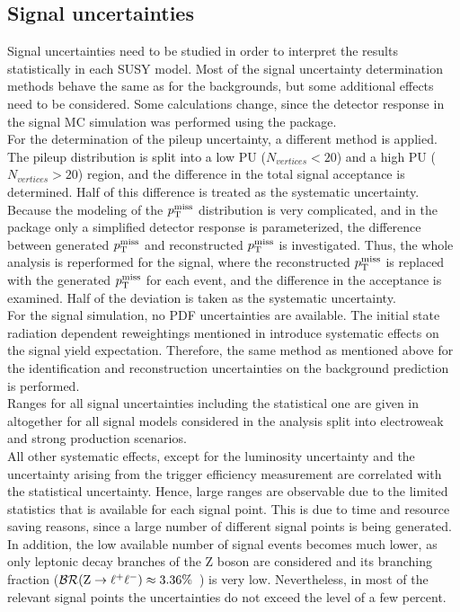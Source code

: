 \subsection{Signal uncertainties}
Signal uncertainties need to be studied in order to interpret the results statistically in each SUSY model.
Most of the signal uncertainty determination methods behave the same as for the backgrounds, but some additional effects need to be considered. Some calculations change, since the detector response in the signal MC simulation was performed using the \FASTSIM package.\\
For the determination of the pileup uncertainty, a different method is applied. The pileup distribution is split into a low PU ($N_{vertices}<20$) and a high PU ($N_{vertices}>20$) region, and the difference in the total signal acceptance is determined. Half of this difference is treated as the systematic uncertainty.\\
Because the modeling of the $p_{\mathrm{T}}^\text{miss}$ distribution is very complicated, and in the \FASTSIM package only a simplified detector response is parameterized, the difference between generated $p_{\mathrm{T}}^\text{miss}$ and reconstructed $p_{\mathrm{T}}^\text{miss}$ is investigated. Thus, the whole analysis is reperformed for the signal, where the reconstructed $p_{\mathrm{T}}^\text{miss}$ is replaced with the generated $p_{\mathrm{T}}^\text{miss}$ for each event, and the difference in the acceptance is examined. Half of the deviation is taken as the systematic uncertainty.\\
For the signal simulation, no PDF uncertainties are available. The initial state radiation dependent reweightings mentioned in  introduce systematic effects on the signal yield expectation. Therefore, the same method as mentioned above for the identification and reconstruction uncertainties on the background prediction is performed.\\
Ranges for all signal uncertainties including the statistical one are given in  altogether for all signal models considered in the analysis split into electroweak and strong production scenarios.\\
All other systematic effects, except for the luminosity uncertainty and the uncertainty arising from the trigger efficiency measurement are correlated with the statistical uncertainty.
Hence, large ranges are observable due to the limited statistics that is available for each signal point. This is due to time and resource saving reasons, since a large number of different signal points is being generated. In addition, the low available number of signal events becomes much lower, as only leptonic decay branches of the Z boson are considered and its branching fraction ($\mathcal{BR}(\mathrm{Z}\to\ell^+\ell^-)\approx3.36\%$~\cite{PDG}) is very low. Nevertheless, in most of the relevant signal points the uncertainties do not exceed the level of a few percent.

